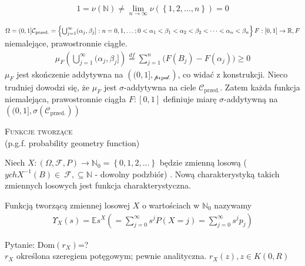 \begin{gather*}
1=\nu\left(\mathbb N \right) \neq \lim\limits_{n\to\infty} \nu \left(\left\{1,2,\dots,n\right\}\right)=0
\end{gather*}
\begin{prz}
$ \Omega=(0,1]\\
\mathcal{C_{\text{przed.}}}=\left\{\bigcup_{j=1}^\infty (\alpha_j,\beta_j]:n=0,1,\dots;0<\alpha_1<\beta_1<\alpha_2<\beta_2<\dots<\alpha_n<\beta_n\right\}\\
F:[0,1]\to\mathbb R,F $ niemalejące, prawostronnie ciągłe.
\begin{gather*}
\mu_F \left(\bigcup_{j=1}^\infty (\alpha_j,\beta_j]\right)\stackrel{df}{=}
\sum_{j=1}^{n}\bigl(F\left(B_j\right)-F\left(\alpha_j\right)\bigr)\ge0
\end{gather*}
$ \mu_F $ jest skończenie addytywna na $ \left((0,1],\mathcal{_{\text{przed.}}}\right) $, co widać z konstrukcji. Nieco trudniej dowodzi się, że $ \mu_F $ jest $\sigma$-addytywna na ciele $ \mathcal C_{\text{przed.}} $. Zatem każda funkcja niemalejąca, prawostronnie ciągła $ F:\left[0,1\right] $ definiuje miarę $\sigma$-addytywną na $ \left((0,1],\sigma\left(\mathcal C_{\text{przed.}}\right)\right) $
\end{prz}
\begin{center}
{\LARGE \textsc{Funkcje tworzące}}\\
(p.g.f. probability geometry function)
\end{center}
Niech $ X:(\Omega,\mathcal F,P)\to \mathbb N _0=\left\{0,1,2,\dots\right\} $ będzie zmienną losową ($ ychX^{-1}(B)\in\ \mathcal F,\subseteq \mathbb N $ - dowolny podzbiór) . Nową charakterystyką takich zmiennych losowych jest funkcja charakterystyczna.
\begin{defi}Funkcją tworzącą zmiennej losowej $ X $ o wartościach w $ \mathbb N _0 $ nazywamy
\begin{gather*}
\Upsilon_X(s)=\mathbb E s^X\left(=\sum_{j=0}^{\infty }s^jP(X=j)=\sum_{j=0}^{\infty }s^jp_j\right)
\end{gather*}
\end{defi}
Pytanie: Dom$ (r_X) $=?\\
$ r_X $ określona szeregiem potęgowym; pewnie analityczna. $ r_X(z),z\in K(0,R) $
